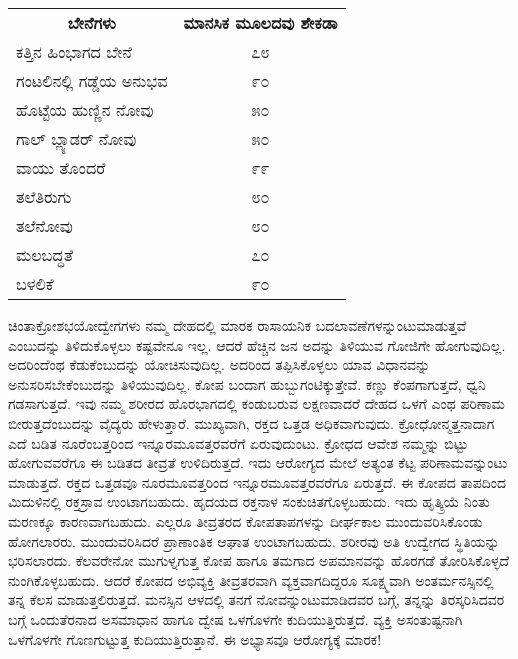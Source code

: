 \begin{longtable}{@{}ll@{}}
\multicolumn{1}{c}{\textbf{ಬೇನೆಗಳು}} & \multicolumn{1}{c}{\textbf{ಮಾನಸಿಕ ಮೂಲದವು ಶೇಕಡಾ}} \\
ಕತ್ತಿನ ಹಿಂಭಾಗದ ಬೇನೆ & \multicolumn{1}{c}{೭೮} \\
ಗಂಟಲಿನಲ್ಲಿ ಗಡ್ಡೆಯ ಅನುಭವ & \multicolumn{1}{c}{೯೦} \\
ಹೊಟ್ಟೆಯ ಹುಣ್ಣಿನ ನೋವು & \multicolumn{1}{c}{೫೦} \\
ಗಾಲ್ ಬ್ಲ್ಯಾಡರ್ ನೋವು & \multicolumn{1}{c}{೫೦} \\
ವಾಯು ತೊಂದರೆ & \multicolumn{1}{c}{೯೯} \\
ತಲೆತಿರುಗು & \multicolumn{1}{c}{೮೦} \\
ತಲೆನೋವು & \multicolumn{1}{c}{೮೦} \\
ಮಲಬದ್ಧತೆ & \multicolumn{1}{c}{೭೦} \\
ಬಳಲಿಕೆ & \multicolumn{1}{c}{೯೦} \\
\end{longtable}

ಚಿಂತಾಕ್ರೋಶಭಯೋದ್ವೇಗಗಳು ನಮ್ಮ ದೇಹದಲ್ಲಿ ಮಾರಕ ರಾಸಾಯನಿಕ ಬದಲಾವಣೆ\-ಗಳನ್ನುಂಟು\-ಮಾಡುತ್ತವೆ ಎಂಬುದನ್ನು ತಿಳಿದುಕೊಳ್ಳಲು ಕಷ್ಟವೇನೂ ಇಲ್ಲ. ಆದರೆ ಹೆಚ್ಚಿನ ಜನ ಅದನ್ನು ತಿಳಿಯುವ ಗೋಜಿಗೇ ಹೋಗುವುದಿಲ್ಲ. ಅದರಿಂದೆಂಥ ಕೆಡುಕೆಂಬುದನ್ನು ಯೋಚಿಸುವು\-ದಿಲ್ಲ. ಅದರಿಂದ ತಪ್ಪಿಸಿಕೊಳ್ಳಲು ಯಾವ ವಿಧಾನವನ್ನು ಅನುಸರಿಸಬೇಕೆಂಬುದನ್ನು ತಿಳಿಯು\-ವುದಿಲ್ಲ. ಕೋಪ ಬಂದಾಗ ಹುಬ್ಬುಗಂಟಿಕ್ಕುತ್ತೇವೆ. ಕಣ್ಣು ಕೆಂಪಗಾಗುತ್ತದೆ, ಧ್ವನಿ ಗಡಸಾಗು\-ತ್ತದೆ. ಇವು ನಮ್ಮ ಶರೀರದ ಹೊರಭಾಗದಲ್ಲಿ ಕಂಡುಬರುವ ಲಕ್ಷಣವಾದರೆ ದೇಹದ ಒಳಗೆ ಎಂಥ ಪರಿಣಾಮ ಬೀರುತ್ತದೆಂಬುದನ್ನು ವೈದ್ಯರು ಹೇಳುತ್ತಾರೆ. ಮುಖ್ಯವಾಗಿ, ರಕ್ತದ ಒತ್ತಡ ಅಧಿಕವಾಗುವುದು. ಕ್ರೋಧೋನ್ಮತ್ತನಾದಾಗ ಎದೆ ಬಡಿತ ನೂರೆಂಬತ್ತರಿಂದ ಇನ್ನೂರಮೂವತ್ತರವರೆಗೆ ಏರುವುದುಂಟು. ಕ್ರೋಧದ ಆವೇಶ ನಮ್ಮನ್ನು ಬಿಟ್ಟು ಹೋಗುವವರೆಗೂ ಈ ಬಡಿತದ ತೀವ್ರತೆ ಉಳಿದಿರುತ್ತದೆ. ಇದು ಆರೋಗ್ಯದ ಮೇಲೆ ಅತ್ಯಂತ ಕೆಟ್ಟ ಪರಿಣಾಮವನ್ನುಂಟು ಮಾಡುತ್ತದೆ. ರಕ್ತದ ಒತ್ತಡವೂ ನೂರಮೂವತ್ತರಿಂದ ಇನ್ನೂರಮೂವತ್ತರವರೆಗೂ ಏರುತ್ತದೆ. ಈ ಕೋಪದ ತಾಪದಿಂದ ಮಿದುಳಿನಲ್ಲಿ ರಕ್ತಸ್ರಾವ ಉಂಟಾಗಬಹುದು. ಹೃದಯದ ರಕ್ತನಾಳ ಸಂಕುಚಿತಗೊಳ್ಳಬಹುದು. ಇದು ಹೃತ್ಕ್ರಿಯೆ ನಿಂತು ಮರಣಕ್ಕೂ ಕಾರಣವಾಗಬಹುದು. ಎಲ್ಲರೂ ತೀವ್ರತರದ ಕೋಪತಾಪಗಳನ್ನು ದೀರ್ಘಕಾಲ ಮುಂದುವರಿಸಿಕೊಂಡು ಹೋಗಲಾರರು. ಮುಂದುವರಿಸಿದರೆ ಪ್ರಾಣಾಂತಿಕ ಆಘಾತ ಉಂಟಾಗಬಹುದು. ಶರೀರವು ಅತಿ ಉದ್ವೇಗದ ಸ್ಥಿತಿಯನ್ನು ಭರಿಸಲಾರದು. ಕೆಲವರೇನೋ ಮುಗುಳ್ನಗುತ್ತ ಕೋಪ ಹಾಗೂ ತಮಗಾದ ಅಪಮಾನವನ್ನು ಹೊರಗಡೆ ತೋರಿಸಿಕೊಳ್ಳದೆ ನುಂಗಿಕೊಳ್ಳಬಹುದು. ಆದರೆ ಕೋಪದ ಅಭಿವ್ಯಕ್ತಿ ತೀವ್ರತರವಾಗಿ ವ್ಯಕ್ತವಾಗ\-ದಿದ್ದರೂ ಸೂಕ್ಷ್ಮವಾಗಿ ಅಂತರ್ಮನಸ್ಸಿನಲ್ಲಿ ತನ್ನ ಕೆಲಸ ಮಾಡುತ್ತಲಿರುತ್ತದೆ. ಮನಸ್ಸಿನ ಆಳದಲ್ಲಿ ತನಗೆ ನೋವನ್ನುಂಟುಮಾಡಿದವರ ಬಗ್ಗೆ, ತನ್ನನ್ನು ತಿರಸ್ಕರಿಸಿದವರ ಬಗ್ಗೆ ಒಂದು\break ತೆರನಾದ ಅಸಮಾಧಾನ ಹಾಗೂ ದ್ವೇಷ ಒಳಗೊಳಗೇ ಕುದಿಯುತ್ತಿರುತ್ತದೆ. ವ್ಯಕ್ತಿ ಅಸಂತುಷ್ಟನಾಗಿ ಒಳಗೊಳಗೇ ಗೊಣಗುಟ್ಟುತ್ತ ಕುದಿಯುತ್ತಿರುತ್ತಾನೆ. ಈ ಅಭ್ಯಾಸವೂ ಆರೋಗ್ಯಕ್ಕೆ ಮಾರಕ!

